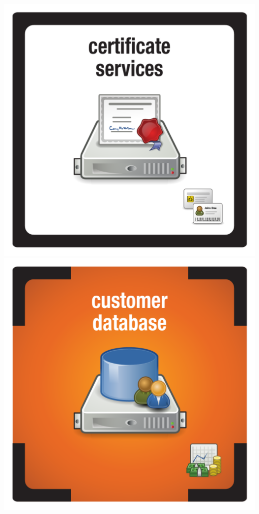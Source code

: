 \documentclass{letter}
\begin{document}
\includegraphics{tiles/node_cert_sevices}
\includegraphics{tiles/node_customer_db_compromised} \\
\end{document}
